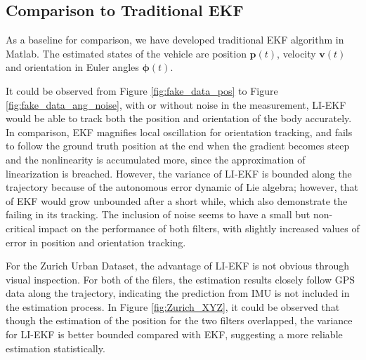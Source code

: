 
\subsection{Comparison to Traditional EKF}
 As a baseline for comparison, we have developed traditional EKF algorithm in Matlab. The estimated states of the vehicle are position $\mathbf{p}(t)$, velocity $\mathbf{v}(t)$ and orientation in Euler angles $\mathbf{\phi}(t)$.

It could be observed from Figure \ref{fig:fake_data_pos} to Figure \ref{fig:fake_data_ang_noise}, with or without noise in the measurement, LI-EKF would be able to track both the position and orientation of the body accurately. In comparison, EKF magnifies local oscillation for orientation tracking, and fails to follow the ground truth position at the end when the gradient becomes steep and the nonlinearity is accumulated more, since the approximation of linearization is breached. However, the variance of LI-EKF is bounded along the trajectory because of the autonomous error dynamic of Lie algebra; however, that of EKF would grow unbounded after a short while, which also demonstrate the failing in its tracking. The inclusion of noise seems to have a small but non-critical impact on the performance of both filters, with slightly increased values of error in position and orientation tracking.

For the Zurich Urban Dataset, the advantage of LI-EKF is not obvious through visual inspection. For both of the filers, the estimation results closely follow GPS data along the trajectory, indicating the prediction from IMU is not included in the estimation process. In Figure \ref{fig:Zurich_XYZ}, it could be observed that though the estimation of the position for the two filters overlapped, the variance for LI-EKF is better bounded compared with EKF, suggesting a more reliable estimation statistically.